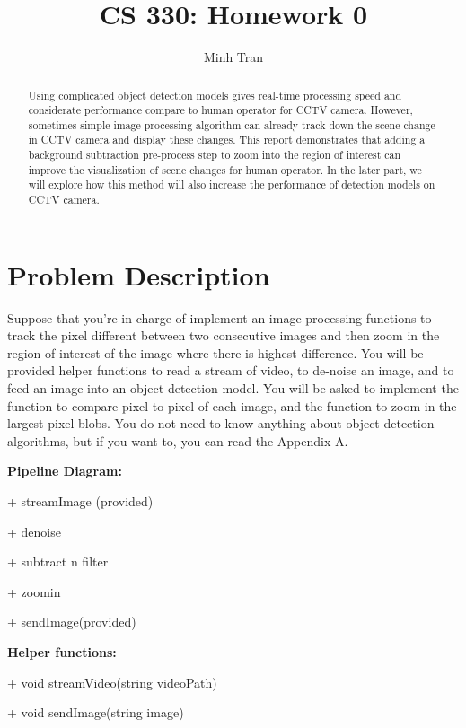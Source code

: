 \documentclass[]{article}
\title{CS 330: Homework 0}
\author{Minh Tran}
\begin{document}
	
	\maketitle
	
	\begin{abstract}
		
		Using complicated object detection models gives real-time processing speed and considerate performance compare to human operator for CCTV camera. However, sometimes simple image processing algorithm can already track down the scene change in CCTV camera and display these changes. This report demonstrates that adding a background subtraction pre-process step to zoom into the region of interest can improve the visualization of scene changes for human operator. In the later part, we will explore how this method will also increase the performance of detection models on CCTV camera.
		
	\end{abstract}
	
	\section{Problem Description}
	Suppose that you're in charge of implement an image processing functions to track the pixel different between two consecutive images and then zoom in the region of interest of the image where there is highest difference. You will be provided helper functions to read a stream of video, to de-noise an image, and to feed an image into an object detection model. You will be asked to implement the function to compare pixel to pixel of each image, and the function to zoom in the largest pixel blobs. You do not need to know anything about object detection algorithms, but if you want to, you can read the Appendix A.
	
	\textbf{Pipeline Diagram:} \par
	
	+ streamImage (provided) \par
	+ denoise \par
	+ subtract n filter \par
	+ zoomin \par
	+ sendImage(provided) \par
	
	 
	
	
	\textbf{Helper functions:} \par
	+ void streamVideo(string videoPath) \par
	+ void sendImage(string image) \\
	
\end{document}
